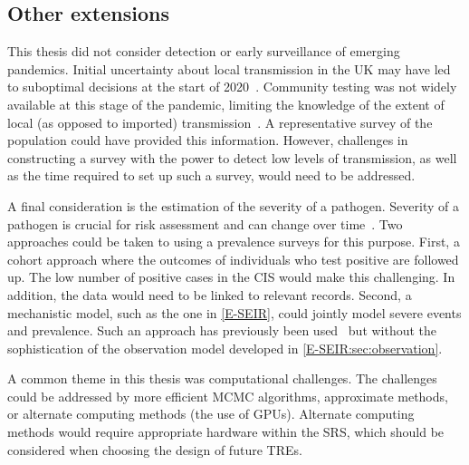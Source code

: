 \documentclass[thesis.tex]{subfiles}
\begin{document}
\subsection{Other extensions}

This thesis did not consider detection or early surveillance of emerging pandemics.
Initial uncertainty about local transmission in the UK may have led to suboptimal decisions at the start of 2020~\autocite{pellisChallenges}.
Community testing was not widely available at this stage of the pandemic, limiting the knowledge of the extent of local (as opposed to imported) transmission~\autocite{whittyTechReportCOVID}.
A representative survey of the population could have provided this information.
However, challenges in constructing a survey with the power to detect low levels of transmission, as well as the time required to set up such a survey, would need to be addressed.

A final consideration is the estimation of the severity of a pathogen.
Severity of a pathogen is crucial for risk assessment and can change over time~\autocite[e.g.][]{kirwanSeverityTrends}.
Two approaches could be taken to using a prevalence surveys for this purpose.
First, a cohort approach where the outcomes of individuals who test positive are followed up.
The low number of positive cases in the CIS would make this challenging.
In addition, the data would need to be linked to relevant records.
Second, a mechanistic model, such as the one in \cref{E-SEIR}, could jointly model severe events and prevalence.
Such an approach has previously been used~\autocite{daviesAssociation,ironsEstimating,knockKey,nicholsonImproving,pooleyEstimation,birrellRTM2} but without the sophistication of the observation model developed in \cref{E-SEIR:sec:observation}.

A common theme in this thesis was computational challenges.
The challenges could be addressed by more efficient MCMC algorithms, approximate methods, or alternate computing methods (\eg the use of GPUs).
Alternate computing methods would require appropriate hardware within the SRS, which should be considered when choosing the design of future TREs.

\ifSubfilesClassLoaded{
  \listoftodos
}{}
\end{document}
